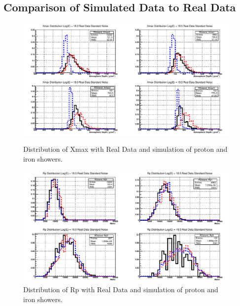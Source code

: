 \subsection{Comparison of Simulated Data to Real Data}
\begin{figure}
\centering
\includegraphics[width=\textwidth]{chapters/graphs/SelectionEff/RealDataAndSim_XmaxDistComp.pdf}
\caption{Distribution of Xmax with Real Data and simulation of proton and iron showers.}
\vspace{3mm}
\includegraphics[width=\textwidth]{chapters/graphs/SelectionEff/RealDataAndSim_RpDistComp.pdf}
\caption{Distribution of Rp with Real Data and simulation of proton and iron showers.}
\end{figure}

